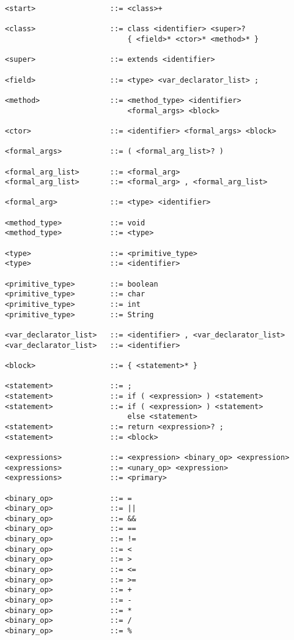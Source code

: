 \documentclass [a4paper,titlepage]{report}
\begin{document}
\begin{verbatim}
<start>                 ::= <class>+

<class>                 ::= class <identifier> <super>? 
                            { <field>* <ctor>* <method>* }

<super>                 ::= extends <identifier>

<field>                 ::= <type> <var_declarator_list> ;

<method>                ::= <method_type> <identifier> 
                            <formal_args> <block>

<ctor>                  ::= <identifier> <formal_args> <block>

<formal_args>           ::= ( <formal_arg_list>? )

<formal_arg_list>       ::= <formal_arg>
<formal_arg_list>       ::= <formal_arg> , <formal_arg_list>

<formal_arg>            ::= <type> <identifier>

<method_type>           ::= void
<method_type>           ::= <type>

<type>                  ::= <primitive_type>
<type>                  ::= <identifier>

<primitive_type>        ::= boolean
<primitive_type>        ::= char
<primitive_type>        ::= int
<primitive_type>        ::= String

<var_declarator_list>   ::= <identifier> , <var_declarator_list>
<var_declarator_list>   ::= <identifier>

<block>                 ::= { <statement>* }

<statement>             ::= ;
<statement>             ::= if ( <expression> ) <statement>
<statement>             ::= if ( <expression> ) <statement> 
                            else <statement>
<statement>             ::= return <expression>? ;
<statement>             ::= <block>

<expressions>           ::= <expression> <binary_op> <expression>
<expressions>           ::= <unary_op> <expression>
<expressions>           ::= <primary>

<binary_op>             ::= =
<binary_op>             ::= || 
<binary_op>             ::= &&
<binary_op>             ::= ==
<binary_op>             ::= !=
<binary_op>             ::= <
<binary_op>             ::= >
<binary_op>             ::= <=
<binary_op>             ::= >=
<binary_op>             ::= +
<binary_op>             ::= -
<binary_op>             ::= *
<binary_op>             ::= /
<binary_op>             ::= %


\end{verbatim}
\end{document}

